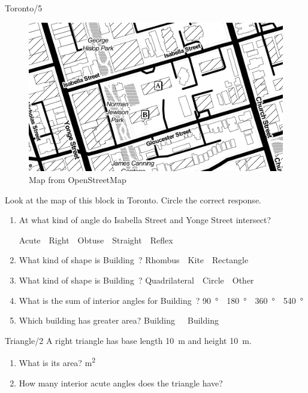 \documentclass[12pt,letterpaper]{article}
\begin{document}
\begin{problem}{Toronto\hfill/5}
\begin{figure}[h]
  \begin{center}
    \includegraphics[trim=50 50 50 50, clip, width=.5\textwidth]{toronto.png}
  \end{center}
  \caption{Map from OpenStreetMap}
\end{figure}

 Look at the map of this block in Toronto. Circle the correct response.

 \begin{enumerate}
  \item At what kind of angle do Isabella Street and Yonge Street intersect?

  \hfill Acute~~Right~~Obtuse~~Straight~~Reflex

  \item What kind of shape is Building~?
  \hfill Rhombus~~Kite~~Rectangle

  \item What kind of shape is Building~?
  \hfill Quadrilateral~~Circle~~Other

  \item What is the sum of interior angles for Building~? \hfill
  \SI{90}{\degree}~~\SI{180}{\degree}~~\SI{360}{\degree}~~\SI{540}{\degree}

  \item Which building has greater area?
  \hfill Building~~~Building~
 \end{enumerate}
\end{problem}

\begin{problem}{Triangle\hfill/2}
 A right triangle has base length \SI{10}{\meter} and height \SI{10}{\meter}.

 \begin{enumerate}
  \item What is its area?
  \hfill \underline{\hspace{3em}} \si{\meter^2}
  \item How many interior acute angles does the triangle have?
  \hfill \underline{\hspace{3em}}
 \end{enumerate}
\end{problem}
\end{document}
